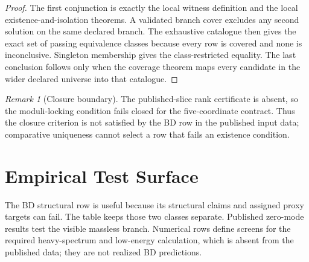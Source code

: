 \documentclass[11pt]{article}
\theoremstyle{remark}
\newtheorem{remark}[theorem]{Remark}
\theoremstyle{plain}
\begin{document}
\begin{proof}
The first conjunction is exactly the local witness definition and the local existence-and-isolation
theorems. A validated branch cover excludes any second solution on the same declared branch. The
exhaustive catalogue then gives the exact set of passing equivalence classes because every row is
covered and none is inconclusive. Singleton membership gives the class-restricted equality. The
last conclusion follows only when the coverage theorem maps every candidate in the wider declared
universe into that catalogue.
\end{proof}

\begin{remark}[Closure boundary]
The published-slice rank certificate is absent, so the moduli-locking condition fails closed
for the five-coordinate contract. Thus the closure criterion is not satisfied by the
BD row in the published input data; comparative
uniqueness cannot select a row that fails an existence condition.
\end{remark}

\section{Empirical Test Surface}

The BD structural row is useful because its structural claims and assigned proxy targets can fail. The
table keeps those two classes separate. Published zero-mode results test the visible massless
branch. Numerical rows define screens for the required heavy-spectrum and low-energy calculation,
which is absent from the published data; they are not realized BD predictions.
\end{document}
